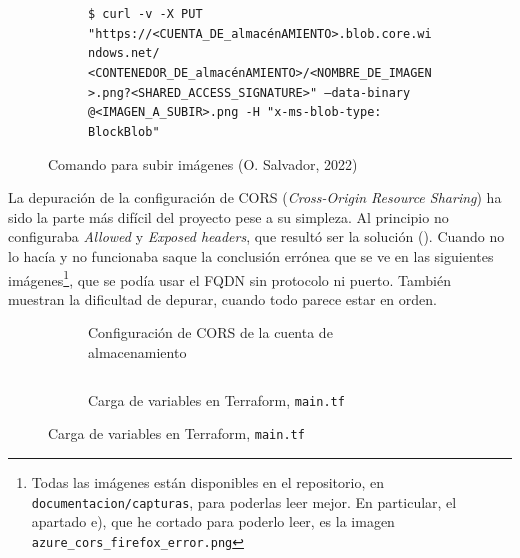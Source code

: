 \documentclass[11pt]{article}
\begin{document}
\begin{flushleft}
		\begin{figure}[htb]
			\centering
			\begin{subfigure}{\textwidth}
                \vspace{-.2cm}
				\footnotesize
				\texttt{\$ curl -v -X PUT "https://<CUENTA\_DE\_almacénAMIENTO>.blob.core.windows.net/\\<CONTENEDOR\_DE\_almacénAMIENTO>/<NOMBRE\_DE\_IMAGEN>.png?<SHARED\_ACCESS\_SIGNATURE>"\ --data-binary @<IMAGEN\_A\_SUBIR>.png -H "x-ms-blob-type: BlockBlob"} 
			\end{subfigure}
			\caption{Comando para subir imágenes (O. Salvador, 2022)}
		\end{figure}

	\clearpage
	La depuración de la configuración de CORS (\textit{Cross-Origin Resource Sharing}) ha sido la parte más difícil del proyecto pese a su simpleza. Al principio no configuraba  \textit{Allowed} y \textit{Exposed headers}, que resultó ser la solución (\cite{cors_almacen}). Cuando no lo hacía y no funcionaba saque la conclusión errónea que se ve en las siguientes imágenes\footnote{Todas las imágenes están disponibles en el repositorio, en \texttt{documentacion/capturas}, para poderlas leer mejor. En particular, el apartado e), que he cortado para poderlo leer, es la imagen \texttt{azure\_cors\_firefox\_error.png}}, que se podía usar el FQDN sin protocolo ni puerto. También muestran la dificultad de depurar, cuando todo parece estar en orden.
	\linebreak

		\begin{figure}[htb]
			\centering
			\begin{subfigure}{\textwidth}
				\centering
				\caption{Configuración de CORS de la cuenta de almacenamiento}
			\end{subfigure}
			\linebreak
			
			\begin{subfigure}{.92\linewidth}
				\inputminted[fontsize=\tiny, firstline=33, lastline=36, linenos, frame=single, breaklines]{javascript}{../../frontend/terraform/main.tf}
				\vspace{-.5cm}
				\caption{Carga de variables en Terraform, \texttt{main.tf}}
			\end{subfigure}
			\linebreak
			

\end{figure}
\end{flushleft}
\end{document}
